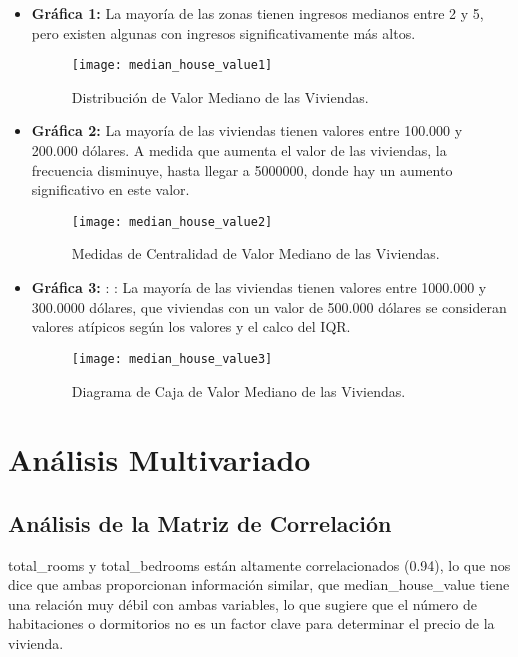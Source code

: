 \documentclass[a4paper, 10pt]{article}
\begin{document}
\begin{itemize}
    \item \textbf{Gráfica 1:} La mayoría de las zonas tienen ingresos medianos entre 2 y 5, pero existen algunas con ingresos significativamente más altos.
    \begin{figure}[H]
        \centering
        \texttt{[image: median\_house\_value1]}
        \caption{Distribución de Valor Mediano de las Viviendas.}
    \end{figure}

    \item \textbf{Gráfica 2:} La mayoría de las viviendas tienen valores entre 100.000 y 200.000 dólares.
A medida que aumenta el valor de las viviendas, la frecuencia disminuye, hasta llegar a 5000000, donde hay un aumento significativo en este valor.

    \begin{figure}[H]
        \centering
        \texttt{[image: median\_house\_value2]}
        \caption{Medidas de Centralidad de Valor Mediano de las Viviendas.}
    \end{figure}

    \item \textbf{Gráfica 3:} : : La mayoría de las viviendas tienen valores entre 1000.000 y 300.0000 dólares, que viviendas con un valor de 500.000 dólares se consideran valores atípicos según los valores y el calco del IQR.
    \begin{figure}[H]
        \centering
        \texttt{[image: median\_house\_value3]}
        \caption{Diagrama de Caja de Valor Mediano de las Viviendas.}
    \end{figure}
\end{itemize}


\section{Análisis Multivariado}

\subsection{Análisis de la Matriz de Correlación}

total\_rooms y total\_bedrooms están altamente correlacionados (0.94), lo que nos dice que ambas proporcionan información similar, que median\_house\_value tiene una relación muy débil con ambas variables, lo que sugiere que el número de habitaciones o dormitorios no es un factor clave para determinar el precio de la vivienda.
\end{document}
